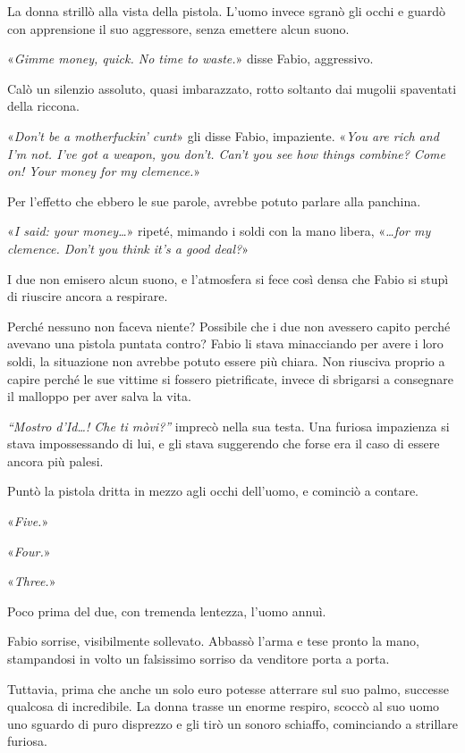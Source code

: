La donna strillò alla vista della pistola. L'uomo invece sgranò gli occhi e guardò con apprensione il suo aggressore, senza emettere alcun suono.

«\textit{Gimme money, quick. No time to waste.}» disse Fabio, aggressivo.

Calò un silenzio assoluto, quasi imbarazzato, rotto soltanto dai mugolii spaventati della riccona.

«\textit{Don't be a motherfuckin' cunt}» gli disse Fabio, impaziente. «\textit{You are rich and I'm not. I've got a weapon, you don't. Can't you see how things combine? Come on! Your money for my clemence.}»

Per l'effetto che ebbero le sue parole, avrebbe potuto parlare alla panchina.

«\textit{I said: your money\ldots}» ripeté, mimando i soldi con la mano libera, «\textit{\ldots for my clemence. Don't you think it's a good deal?}»

I due non emisero alcun suono, e l'atmosfera si fece così densa che Fabio si stupì di riuscire ancora a respirare. 

Perché nessuno non faceva niente? Possibile che i due non avessero capito perché avevano una pistola puntata contro? Fabio li stava minacciando per avere i loro soldi, la situazione non avrebbe potuto essere più chiara. Non riusciva proprio a capire perché le sue vittime si fossero pietrificate, invece di sbrigarsi a consegnare il malloppo per aver salva la vita.

\textit{``Mostro d'Id\ldots! Che ti mòvi?''} imprecò nella sua testa. Una furiosa impazienza si stava impossessando di lui, e gli stava suggerendo che forse era il caso di essere ancora più palesi.

Puntò la pistola dritta in mezzo agli occhi dell'uomo, e cominciò a contare.

«\textit{Five.}»

«\textit{Four.}»

«\textit{Three.}»

Poco prima del due, con tremenda lentezza, l'uomo annuì. 

Fabio sorrise, visibilmente sollevato. Abbassò l'arma e tese pronto la mano, stampandosi in volto un falsissimo sorriso da venditore porta a porta. 

Tuttavia, prima che anche un solo euro potesse atterrare sul suo palmo, successe qualcosa di incredibile. La donna trasse un enorme respiro, scoccò al suo uomo uno sguardo di puro disprezzo e gli tirò un sonoro schiaffo, cominciando a strillare furiosa.

